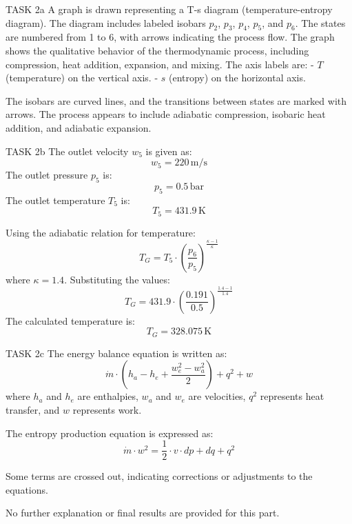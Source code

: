 TASK 2a  
A graph is drawn representing a T-s diagram (temperature-entropy diagram). The diagram includes labeled isobars \( p_2 \), \( p_3 \), \( p_4 \), \( p_5 \), and \( p_6 \). The states are numbered from 1 to 6, with arrows indicating the process flow. The graph shows the qualitative behavior of the thermodynamic process, including compression, heat addition, expansion, and mixing. The axis labels are:  
- \( T \) (temperature) on the vertical axis.  
- \( s \) (entropy) on the horizontal axis.  

The isobars are curved lines, and the transitions between states are marked with arrows. The process appears to include adiabatic compression, isobaric heat addition, and adiabatic expansion.  

TASK 2b  
The outlet velocity \( w_5 \) is given as:  
\[
w_5 = 220 \, \text{m/s}
\]  
The outlet pressure \( p_5 \) is:  
\[
p_5 = 0.5 \, \text{bar}
\]  
The outlet temperature \( T_5 \) is:  
\[
T_5 = 431.9 \, \text{K}
\]  

Using the adiabatic relation for temperature:  
\[
T_G = T_5 \cdot \left( \frac{p_6}{p_5} \right)^{\frac{\kappa - 1}{\kappa}}
\]  
where \( \kappa = 1.4 \). Substituting the values:  
\[
T_G = 431.9 \cdot \left( \frac{0.191}{0.5} \right)^{\frac{1.4 - 1}{1.4}}
\]  
The calculated temperature is:  
\[
T_G = 328.075 \, \text{K}
\]  

TASK 2c  
The energy balance equation is written as:  
\[
\dot{m} \cdot \left( h_a - h_e + \frac{w_e^2 - w_a^2}{2} \right) + q^2 + w
\]  
where \( h_a \) and \( h_e \) are enthalpies, \( w_a \) and \( w_e \) are velocities, \( q^2 \) represents heat transfer, and \( w \) represents work.  

The entropy production equation is expressed as:  
\[
\dot{m} \cdot w^2 = \frac{1}{2} \cdot v \cdot dp + dq + q^2
\]  

Some terms are crossed out, indicating corrections or adjustments to the equations.  

No further explanation or final results are provided for this part.
